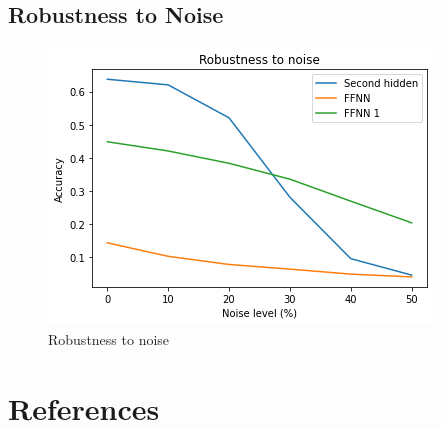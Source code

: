 \documentclass[a4paper, 11pt]{article}
\begin{document}
			
		\subsection{Robustness to Noise}	
			\begin{figure}[H]
				\centering
				\includegraphics[width=.7\linewidth]{noise2.png}   %
				\caption{Robustness to noise}
				\label{fig:robNoise}
			\end{figure}
		
		
		
	\section{References}
		
		\printbibliography
		
		
	
	
	
	
	
	
			
\end{document}
